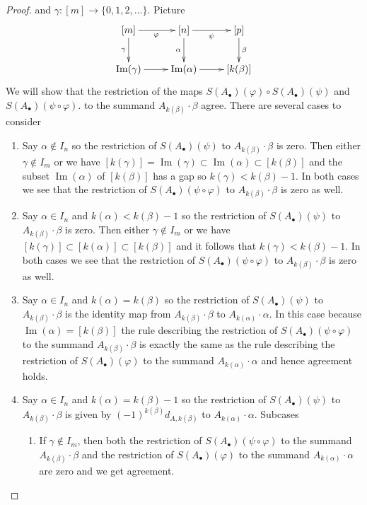 \documentclass{amsart}
\theoremstyle{plain}
\theoremstyle{definition}
\theoremstyle{remark}
\numberwithin{equation}{subsection}
\def\Im{\mathop{\mathrm{Im}}}
\begin{document}
\begin{proof}
and $\gamma : [m] \to \{0, 1, 2, \ldots\}$. Picture
$$
\xymatrix{
[m] \ar[r]_\varphi \ar[d]_\gamma &
[n] \ar[r]_\psi \ar[d]_\alpha &
[p] \ar[d]^\beta \\
\Im(\gamma) \ar[r] &
\Im(\alpha) \ar[r] &
[k(\beta)]
}
$$
We will show that the restriction of the maps
$S(A_\bullet)(\varphi) \circ S(A_\bullet)(\psi)$ and
$S(A_\bullet)(\psi \circ \varphi)$.
to the summand $A_{k(\beta)} \cdot \beta$ agree.
There are several cases to consider
\begin{enumerate}
\item Say $\alpha \not \in I_n$ so the restriction of
$S(A_\bullet)(\psi)$ to $A_{k(\beta)} \cdot \beta$ is zero.
Then either $\gamma \not \in I_m$ or we have
$[k(\gamma)] = \Im(\gamma) \subset \Im(\alpha) \subset [k(\beta)]$
and the subset $\Im(\alpha)$ of $[k(\beta)]$ has a gap so
$k(\gamma) < k(\beta) - 1$. In both cases we see that
the restriction of
$S(A_\bullet)(\psi \circ \varphi)$ to $A_{k(\beta)} \cdot \beta$
is zero as well.
\item Say $\alpha \in I_n$ and $k(\alpha) < k(\beta) - 1$ so the restriction of
$S(A_\bullet)(\psi)$ to $A_{k(\beta)} \cdot \beta$ is zero.
Then either $\gamma \not \in I_m$ or we have
$[k(\gamma)] \subset [k(\alpha)] \subset [k(\beta)]$
and it follows that $k(\gamma) < k(\beta) - 1$. In both cases we see that
the restriction of
$S(A_\bullet)(\psi \circ \varphi)$ to $A_{k(\beta)} \cdot \beta$
is zero as well.
\item Say $\alpha \in I_n$ and $k(\alpha) = k(\beta)$ so the restriction of
$S(A_\bullet)(\psi)$ to $A_{k(\beta)} \cdot \beta$ is
the identity map from $A_{k(\beta)} \cdot \beta$ to
$A_{k(\alpha)} \cdot \alpha$. In this case because $\Im(\alpha) =[k(\beta)]$
the rule describing the restriction of $S(A_\bullet)(\psi \circ \varphi)$
to the summand $A_{k(\beta)} \cdot \beta$ is exactly the same
as the rule describing the restriction of $S(A_\bullet)(\varphi)$
to the summand $A_{k(\alpha)} \cdot \alpha$ and hence agreement holds.
\item Say $\alpha \in I_n$ and $k(\alpha) = k(\beta) - 1$
so the restriction of $S(A_\bullet)(\psi)$ to $A_{k(\beta)} \cdot \beta$
is given by $(-1)^{k(\beta)}d_{A, k(\beta)}$ to $A_{k(\alpha)} \cdot \alpha$.
Subcases
\begin{enumerate}
\item If $\gamma \not \in I_m$, then both the restriction of
$S(A_\bullet)(\psi \circ \varphi)$ to the summand $A_{k(\beta)} \cdot \beta$
and the restriction of $S(A_\bullet)(\varphi)$ to the summand
$A_{k(\alpha)} \cdot \alpha$ are zero and we get agreement.

\end{enumerate}
\end{enumerate}
\end{proof}
\end{document}
